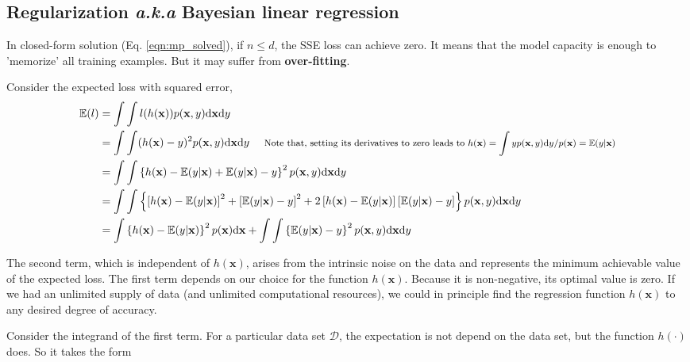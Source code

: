 \documentclass{article}
\begin{document}
	\subsection{Regularization \textit{a.k.a} Bayesian linear regression}
	
	In closed-form solution (Eq. \ref{eqn:mp_solved}), if $n\leq d$, the SSE loss can achieve zero. It means that the model capacity is enough to 'memorize' all training examples. But it may suffer from \textbf{over-fitting}.
	
	Consider the expected loss with squared error,
	\begin{equation}
	\begin{split}
	\mathbb{E}(l) &= \int \int l(h(\mathbf{x})) p(\mathbf{x}, y) \text{d} \mathbf{x} \text{d}y \\
	&= \int \int (h(\mathbf{x})-y)^2 p(\mathbf{x}, y) \text{d} \mathbf{x} \text{d}y
	\ \ \ \ \footnotesize{\text{Note that, setting its derivatives to zero leads to $h(\mathbf{x}) = \int yp(\mathbf{x}, y) \text{d} y /p(\mathbf{x}) = \mathbb{E}(y|\mathbf{x})$}}\\
	&= \int \int \left\{ h(\mathbf{x}) - \mathbb{E} (y|\mathbf{x}) + \mathbb{E} (y|\mathbf{x}) - y \right\}^2 p(\mathbf{x}, y) \text{d} \mathbf{x} \text{d}y \\
	&= \int \int \left\{ \left[ h(\mathbf{x}) - \mathbb{E} (y|\mathbf{x}) \right]^2 + \left[\mathbb{E} (y|\mathbf{x}) - y \right]^2 + 2 \left[ h(\mathbf{x}) - \mathbb{E} (y|\mathbf{x}) \right] \left[\mathbb{E} (y|\mathbf{x}) - y \right]  \right\} p(\mathbf{x}, y) \text{d} \mathbf{x} \text{d}y \\
	&= \int \left\{ h(\mathbf{x}) - \mathbb{E} (y|\mathbf{x}) \right\}^2 p(\mathbf{x}) \text{d} \mathbf{x} + \int \int \left\{\mathbb{E} (y|\mathbf{x}) - y \right\}^2 p(\mathbf{x}, y) \text{d} \mathbf{x} \text{d} y
	\end{split}
	\end{equation}
	
	The second term, which is independent of $h(\mathbf{x})$, arises from the intrinsic noise on the data and represents the minimum achievable value of the expected loss. The first term depends on our choice for the function $h(\mathbf{x})$. Because it is non-negative, its optimal value is zero. If we had an unlimited supply of data (and unlimited computational resources), we could in principle find the regression function $h(\mathbf{x})$ to any desired degree of accuracy.
	
	Consider the integrand of the first term. For a particular data set $\mathcal{D}$, the expectation is not depend on the data set, but the function $h(\cdot)$ does. So it takes the form
	
\end{document}
